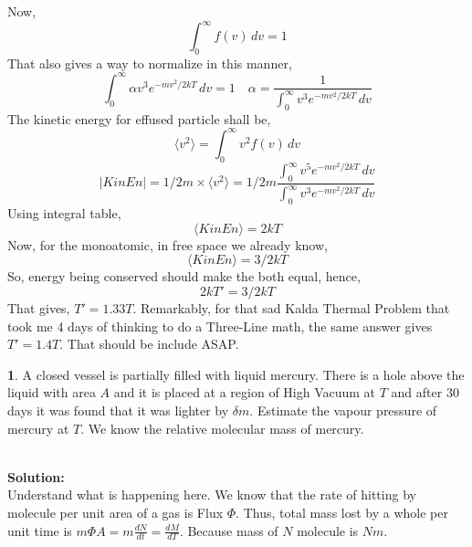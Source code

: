 \documentclass[a4paper]{article}
\theoremstyle{definition}
\newtheorem{prob}{ \framebox[0.09\textwidth]{{\sffamily Pr}} }
\newcommand{\pr}[1]{ \begin{tcolorbox} \begin{prob} 
    #1 
\end{prob} 
   \end{tcolorbox}\ 
   \\
 }
\begin{document}
\begin{center}
\end{center} 
Now, \[ \int_{0}^{\infty} f(v) \, dv = 1 \]
That also gives a way to normalize in this manner, 
\[  \int_{0}^{\infty} \alpha v^3 e^{-mv^2 /2kT} \, dv = 1 \quad \alpha = \frac{1}{\int_{0}^{\infty} v^3 e^{-mv^2 /2kT} \, dv}\]
The kinetic energy for effused particle shall be, 
\[ \langle v^2 \rangle = \int_{0}^{\infty} v^2 f(v) \, dv \]
\[ |KinEn| = 1/2m \times \langle v^2 \rangle = 1/2 m \frac{\int_{0}^{\infty} v^5 e^{-mv^2 /2kT} \, dv}{\int_{0}^{\infty} 
v^3 e^{-mv^2 /2kT} \, dv} \]
Using integral table, 
\[ \langle Kin En \rangle = 2kT \]
Now, for the monoatomic, in free space we already know, 
\[ \langle Kin En \rangle = 3/2 kT \]
So, energy being conserved should make the both equal, hence,
\[ 2kT' = 3/2 kT \]
That gives, $T' = 1.33T $. Remarkably, for that sad Kalda Thermal Problem that took me
4 days of thinking to do a Three-Line math, the same answer gives $T' = 1.4 T$. That should be include ASAP. \\
\pr{A closed vessel is partially filled with
liquid mercury. There is a hole above the liquid with area $A$ and it
is placed at a region of High Vacuum at $T$ and after 30 days it was found that it was lighter by $\delta m$.
Estimate the vapour pressure of mercury at $T$. We know the relative molecular mass of mercury.}
\textbf{Solution:} \\ Understand what is happening here. We know that the rate of hitting by molecule per unit area of a
gas is Flux $\Phi$. Thus, total mass lost by a whole per unit time is $m \Phi A = m \frac{dN}{dt} = \frac{dM}{dT}$. Because
mass of $N$ molecule is $Nm$.
\end{document}

